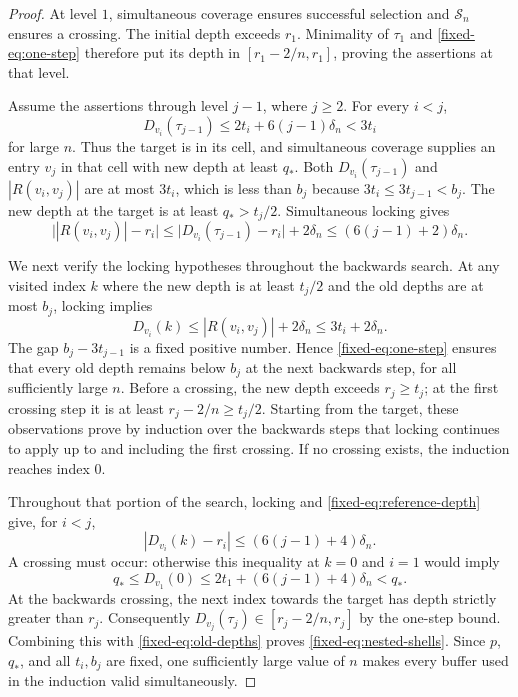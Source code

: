 \begin{proof}
At level $1$, simultaneous coverage ensures successful selection and
$\mathcal S_n$ ensures a crossing. The initial depth exceeds $r_1$.
Minimality of $\tau_1$ and \eqref{fixed-eq:one-step} therefore put its
depth in $[r_1-2/n,r_1]$, proving the assertions at that level.

Assume the assertions through level $j-1$, where $j\ge2$. For every
$i<j$,
\[
 D_{v_i}(\tau_{j-1})\le2t_i+6(j-1)\delta_n<3t_i
\]
for large $n$. Thus the target is in its cell, and simultaneous coverage
supplies an entry $v_j$ in that cell with new depth at least $q_*$.
Both $D_{v_i}(\tau_{j-1})$ and $|R(v_i,v_j)|$ are at most $3t_i$,
which is less than $b_j$ because $3t_i\le3t_{j-1}<b_j$. The new
depth at the target is at least $q_*>t_j/2$. Simultaneous locking gives
\begin{equation}\label{fixed-eq:reference-depth}
 \bigl||R(v_i,v_j)|-r_i\bigr|
 \le\bigl|D_{v_i}(\tau_{j-1})-r_i\bigr|+2\delta_n
 \le(6(j-1)+2)\delta_n.
\end{equation}

We next verify the locking hypotheses throughout the backwards search.
At any visited index $k$ where the new depth is at least $t_j/2$ and
the old depths are at most $b_j$, locking implies
\[
 D_{v_i}(k)\le |R(v_i,v_j)|+2\delta_n
             \le3t_i+2\delta_n.
\]
The gap $b_j-3t_{j-1}$ is a fixed positive number. Hence
\eqref{fixed-eq:one-step} ensures that every old depth remains below
$b_j$ at the next backwards step, for all sufficiently large $n$.
Before a crossing, the new depth exceeds $r_j\ge t_j$; at the first
crossing step it is at least $r_j-2/n\ge t_j/2$. Starting from the
target, these observations prove by induction over the backwards
steps that locking continues to apply up to and including the first
crossing. If no crossing exists, the induction reaches index $0$.

Throughout that portion of the search, locking and
\eqref{fixed-eq:reference-depth} give, for $i<j$,
\begin{equation}\label{fixed-eq:old-depths}
 |D_{v_i}(k)-r_i|\le(6(j-1)+4)\delta_n.
\end{equation}
A crossing must occur: otherwise this inequality at $k=0$ and $i=1$
would imply
\[
 q_*\le D_{v_1}(0)
 \le2t_1+(6(j-1)+4)\delta_n<q_*.
\]
At the backwards crossing, the next index towards the target has depth
strictly greater than $r_j$. Consequently
$D_{v_j}(\tau_j)\in[r_j-2/n,r_j]$ by the one-step bound.
Combining this with \eqref{fixed-eq:old-depths} proves
\eqref{fixed-eq:nested-shells}. Since $p$, $q_*$, and all $t_i,b_j$ are fixed,
one sufficiently large value of $n$ makes every buffer used in the
induction valid simultaneously.
\end{proof}


